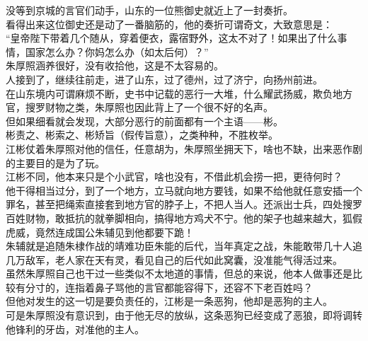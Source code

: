 \begin{multicols}{\theparacolNo}
没等到京城的言官们动手，山东的一位熊御史就近上了一封奏折。\\

看得出来这位御史还是动了一番脑筋的，他的奏折可谓奇文，大致意思是：\\

“皇帝陛下带着几个随从，穿着便衣，露宿野外，这太不对了！如果出了什么事情，国家怎么办？你妈怎么办（如太后何）？”\\

朱厚照涵养很好，没有收拾他，这是不太容易的。\\

人接到了，继续往前走，进了山东，过了德州，过了济宁，向扬州前进。\\

在山东境内可谓麻烦不断，史书中记载的恶行一大堆，什么耀武扬威，欺负地方官，搜罗财物之类，朱厚照也因此背上了一个很不好的名声。\\

但如果细看就会发现，大部分恶行的前面都有一个主语——彬。\\

彬责之、彬索之、彬矫旨（假传旨意），之类种种，不胜枚举。\\

江彬仗着朱厚照对他的信任，任意胡为，朱厚照坐拥天下，啥也不缺，出来恶作剧的主要目的是为了玩。\\

江彬不同，他本来只是个小武官，啥也没有，不借此机会捞一把，更待何时？\\

他干得相当过分，到了一个地方，立马就向地方要钱，如果不给他就任意安插一个罪名，甚至把绳索直接套到地方官的脖子上，不把人当人。还派出士兵，四处搜罗百姓财物，敢抵抗的就拳脚相向，搞得地方鸡犬不宁。他的架子也越来越大，狐假虎威，竟然连成国公朱辅见到他都要下跪！\\

朱辅就是追随朱棣作战的靖难功臣朱能的后代，当年真定之战，朱能敢带几十人追几万敌军，老人家在天有灵，看见自己的后代如此窝囊，没准能气得活过来。\\

虽然朱厚照自己也干过一些类似不太地道的事情，但总的来说，他本人做事还是比较有分寸的，连指着鼻子骂他的言官都能容得下，还容不下老百姓吗？\\

但他对发生的这一切是要负责任的，江彬是一条恶狗，他却是恶狗的主人。\\

可是朱厚照没有意识到，由于他无尽的放纵，这条恶狗已经变成了恶狼，即将调转他锋利的牙齿，对准他的主人。\\


\end{multicols}
